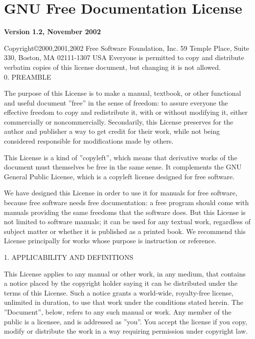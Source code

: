 \section*{GNU Free Documentation License} 

{\bf Version 1.2, November 2002}\par


Copyright\copyright2000,2001,2002  Free Software Foundation, Inc. 59 Temple Place, Suite 330, Boston, MA  02111-1307
USA Everyone is permitted to copy and distribute verbatim copies of this license document, but changing it is not
allowed.
\\

0. PREAMBLE

The purpose of this License is to make a manual, textbook, or other functional and useful document ''free'' in the
sense of freedom: to assure everyone the effective freedom to copy and redistribute it, with or without modifying it,
either commercially or noncommercially. Secondarily, this License preserves for the author and publisher a way to get
credit for their work, while not being considered responsible for modifications made by others.

This License is a kind of ''copyleft'', which means that derivative works of the document must themselves be free in
the same sense. It complements the GNU General Public License, which is a copyleft license designed for free software.

We have designed this License in order to use it for manuals for free software, because free software needs free
documentation: a free program should come with manuals providing the same freedoms that the software does. But this
License is not limited to software manuals; it can be used for any textual work, regardless of subject matter or
whether it is published as a printed book. We recommend this License principally for works whose purpose is instruction
or reference.

1. APPLICABILITY AND DEFINITIONS

This License applies to any manual or other work, in any medium, that contains a notice placed by the copyright holder
saying it can be distributed under the terms of this License. Such a notice grants a world-wide, royalty-free license,
unlimited in duration, to use that work under the conditions stated herein. The ''Document'', below, refers to any such
manual or work. Any member of the public is a licensee, and is addressed as ''you''. You accept the license if you
copy, modify or distribute the work in a way requiring permission under copyright law.

